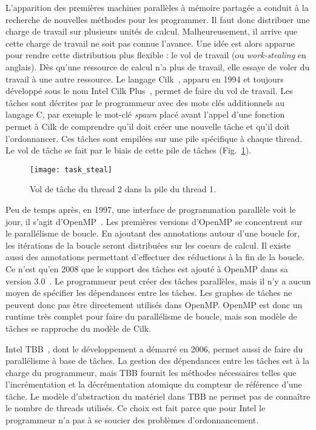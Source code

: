 L'apparition des premières machines parallèles à mémoire partagée a conduit à la recherche de nouvelles méthodes pour les programmer.
%
Il faut donc distribuer une charge de travail sur plusieurs unités de calcul.
%
Malheureusement, il arrive que cette charge de travail ne soit pas connue l'avance.
%
Une idée est alors apparue pour rendre cette distribution plus flexible : le vol de travail (ou {\em work-stealing} en anglais).
%
Dès qu'une ressource de calcul n'a plus de travail, elle essaye de voler du travail à une autre ressource.
%
Le langage Cilk~\cite{Cilk}, apparu en 1994 et toujours développé sous le nom Intel Cilk Plus~\cite{Cilk++}, permet de faire du vol de travail.
%
Les tâches sont décrites par le programmeur avec des mots clés additionnels au langage C, par exemple le mot-clé {\em spawn} placé avant l'appel d'une fonction permet à Cilk de comprendre qu'il doit créer une nouvelle tâche et qu'il doit l'ordonnancer.
%
Ces tâches sont empilées sur une pile spécifique à chaque thread.
%
Le vol de tâche se fait par le biais de cette pile de tâches (Fig.~\ref{fig:task_steal}).
\begin{figure}[t!]
  \centering
  \texttt{[image: task\_steal]}
  \caption{Vol de tâche du thread 2 dans la pile du thread 1.}
  \label{fig:task_steal}
\end{figure}


Peu de temps après, en 1997, une interface de programmation parallèle voit le jour, il s'agit d'OpenMP~\cite{OpenMP}.
%
Les premières versions d'OpenMP se concentrent sur le parallélisme de boucle.
%
En ajoutant des annotations autour d'une boucle for, les itérations de la boucle seront distribuées sur les coeurs de calcul.
%
Il existe aussi des annotations permettant d'effectuer des réductions à la fin de la boucle.
%
Ce n'est qu'en 2008 que le support des tâches est ajouté à OpenMP dans sa version 3.0~\cite{openmptasks}.
%
Le programmeur peut créer des tâches parallèles, mais il n'y a aucun moyen de spécifier les dépendances entre les tâches.
%
Les graphes de tâches ne peuvent donc pas être directement utilisés dans OpenMP.
%
OpenMP est donc un runtime très complet pour faire du parallélisme de boucle, mais son modèle de tâches se rapproche du modèle de Cilk.

Intel TBB~\cite{Intel_TBB}, dont le développement a démarré en 2006, permet aussi de faire du parallélisme à base de tâches.
%
La gestion des dépendances entre les tâches est à la charge du programmeur, mais TBB fournit les méthodes nécessaires telles que l'incrémentation et la décrémentation atomique du compteur de référence d'une tâche.
%
Le modèle d'abstraction du matériel dans TBB ne permet pas de connaître le nombre de threads utilisés.
%
Ce choix est fait parce que pour Intel le programmeur n'a pas à se soucier des problèmes d'ordonnancement.


